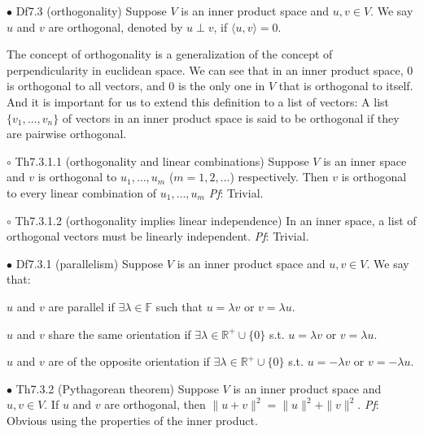 \documentclass{article}
\begin{document}
\begin{Df}{$\bullet$ Df7.3 (orthogonality)}
    Suppose $V$ is an inner product space and $u, v\in V$. We say $u$ and $v$ are orthogonal, denoted by $u\perp v$, if $\langle u, v\rangle = 0$.
\end{Df}

\begin{Rmk}{}
    The concept of orthogonality is a generalization of the concept of perpendicularity in euclidean space. We can see that \textcolor{Th}{in an inner product space, $0$ is orthogonal to all vectors, and $0$ is the only one in $V$ that is orthogonal to itself.} And it is important for us to extend this definition to a list of vectors: \textcolor{Df}{A list $\{v_1, \dots, v_n\}$ of vectors in an inner product space is said to be orthogonal if they are pairwise orthogonal.}
\end{Rmk}

\begin{Th}{$\circ$ Th7.3.1.1 (orthogonality and linear combinations)}
    Suppose $V$ is an inner space and $v$ is orthogonal to $u_1, \dots, u_m$ ($m=1,2,\dots$) respectively. Then $v$ is orthogonal to every linear combination of $u_1, \dots, u_m$
    \tcblower
    \textit{Pf}: Trivial. 
\end{Th}

\begin{Th}{$\circ$ Th7.3.1.2 (orthogonality implies linear independence)}
    In an inner space, a list of orthogonal vectors must be linearly independent.
    \tcblower
    \textit{Pf}: Trivial.
\end{Th}

\begin{Df}{$\bullet$ Df7.3.1 (parallelism)}
    Suppose $V$ is an inner product space and $u, v\in V$. We say that:
    \begin{compactenum}
        \item $u$ and $v$ are parallel if $\exists \lambda\in\mathbb{F}$ such that $u = \lambda v$ or $v = \lambda u$.
        \item $u$ and $v$ share the same orientation if $\exists \lambda\in\mathbb{R}^+\cup \{0\}$ s.t. $u = \lambda v$ or $v = \lambda u$.
        \item $u$ and $v$ are of the opposite orientation if $\exists \lambda\in\mathbb{R}^+\cup \{0\}$ s.t. $u = -\lambda v$ or $v = -\lambda u$. 
    \end{compactenum}
\end{Df}

\begin{Th}{$\bullet$ Th7.3.2 (Pythagorean theorem)}
    Suppose $V$ is an inner product space and $u, v\in V$. If $u$ and $v$ are orthogonal, then $\|u+v\|^2 = \|u\|^2 + \|v\|^2$.
    \tcblower
    \textit{Pf}: Obvious using the properties of the inner product.
\end{Th}
\end{document}
